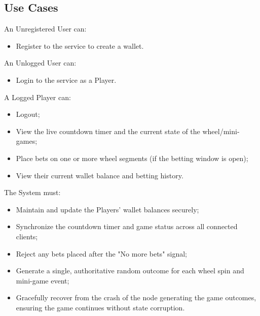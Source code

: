 \documentclass[12pt,a4paper]{article}
\begin{document}
\subsection{Use Cases}
An Unregistered User can:
\begin{itemize}
    \item Register to the service to create a wallet.
\end{itemize}
An Unlogged User can:
\begin{itemize}
    \item Login to the service as a Player.
\end{itemize}
A Logged Player can:
\begin{itemize}
    \item Logout;
    \item View the live countdown timer and the current state of the wheel/mini-games;
    \item Place bets on one or more wheel segments (if the betting window is open);
    \item View their current wallet balance and betting history.
\end{itemize}
The System must:
\begin{itemize}
    \item Maintain and update the Players' wallet balances securely;
    \item Synchronize the countdown timer and game status across all connected clients;
    \item Reject any bets placed after the "No more bets" signal;
    \item Generate a single, authoritative random outcome for each wheel spin and mini-game event;
    \item Gracefully recover from the crash of the node generating the game outcomes, ensuring the game continues without state corruption.
\end{itemize}
\end{document}
